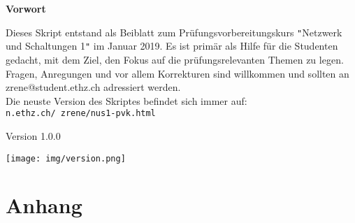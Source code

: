 






 \begin{center}
 	\LARGE\textbf{Vorwort}
 \end{center}
 Dieses Skript entstand als Beiblatt zum Prüfungsvorbereitungskurs \texttt{"}Netzwerk und Schaltungen 1\texttt{"} im Januar 2019.
Es ist primär als Hilfe für die Studenten gedacht, mit dem Ziel, den Fokus auf die prüfungsrelevanten Themen zu legen.
	Fragen, Anregungen und vor allem Korrekturen sind willkommen und sollten an zrene@student.ethz.ch adressiert werden. \\
Die neuste Version des Skriptes befindet sich immer auf: \texttt{n.ethz.ch/~zrene/nus1-pvk.html}
\\
\begin{center}
	Version 1.0.0
\end{center}
\begin{center}
	\hspace{1cm}
	\texttt{[image: img/version.png]}
\end{center}


\cleardoublepage
{}

\tableofcontents                %

\newpage



\newpage







\section{Anhang}


